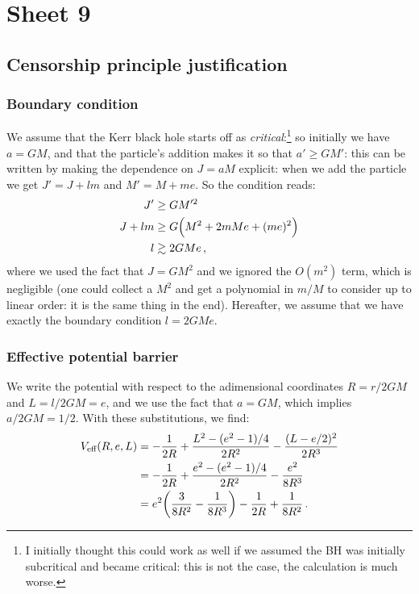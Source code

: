 \documentclass[main.tex]{subfiles}
\begin{document}
\section{Sheet 9}

\subsection{Censorship principle justification}

\subsubsection{Boundary condition}

We assume that the Kerr black hole starts off as \emph{critical}:\footnote{I initially thought this could work as well if we assumed the BH was initially subcritical and became critical: this is not the case, the calculation is much worse.} so initially we have \(a = GM\), and that the particle's addition makes it so that \(a' \geq G M'\): this can be written by making the dependence on \(J = aM\) explicit: when we add the particle we get \(J'= J + lm\) and \(M' = M + me\). So the condition reads: 
%
\begin{subequations}
\begin{align}
  J' &\geq G M^{\prime 2}  \\
  J + lm &\geq G \qty(M^2 + 2mMe + (me)^2)  \\
  l &\gtrsim 2GM e
  \,,
\end{align}
\end{subequations}
%
where we used the fact that \(J = G M^2\) and we ignored the \(O(m^2)\) term, which is negligible (one could collect a \(M^2\) and get a polynomial in \(m/M\) to consider up to linear order: it is the same thing in the end).
Hereafter, we assume that we have exactly the boundary condition \(l = 2GMe\). 

\subsubsection{Effective potential barrier}

We write the potential with respect to the adimensional coordinates \(R = r/2GM\) and \(L= l/2GM = e\), and we  use the fact that \(a = GM\), which implies \(a/2GM = 1/2\). With these substitutions, we find: 
%
\begin{align}
  V _{\text{eff}} (R, e, L) &= 
  - \frac{1}{2R} 
  + \frac{L^2 -  (e^2 - 1) / 4 }{2R^2}
  - \frac{(L - e/2)^2}{2R^3}  \\
  &=   - \frac{1}{2R} 
  + \frac{e^2 -  (e^2 - 1) / 4 }{2R^2}
  - \frac{e^2}{8R^3}  \\
  &= e^2 \qty(\frac{3}{8R^2} - \frac{1}{8R^3}) - \frac{1}{2R} + \frac{1}{8R^2}
\,.
\end{align}
\end{document}
